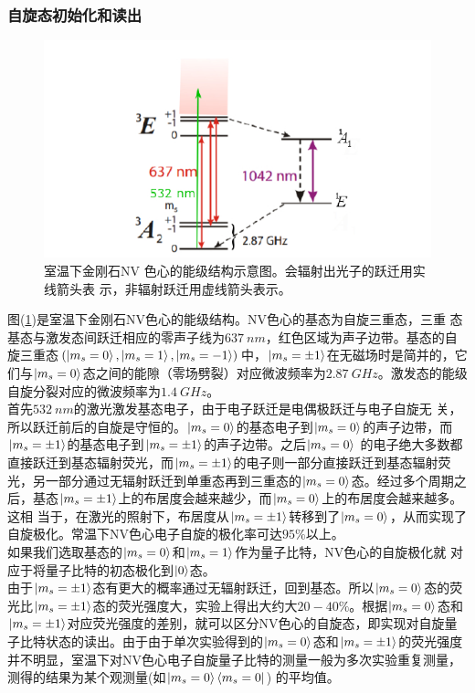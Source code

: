 \documentclass[a4paper]{article}
\begin{document}
\subsubsection{自旋态初始化和读出}
\begin{figure}[H]
	\centering
	\includegraphics[width=0.8\linewidth]{fig/energy.jpg}
	\caption{室温下金刚石NV 色心的能级结构示意图。会辐射出光子的跃迁用实线箭头表
		示，非辐射跃迁用虚线箭头表示。}
	\label{fig:energy}
\end{figure}
图(\ref{fig:energy})是室温下金刚石NV色心的能级结构。NV色心的基态为自旋三重态，三重
态基态与激发态间跃迁相应的零声子线为$ \SI{637}{nm} $，红色区域为声子边带。基态的自旋三重态$ (\ket{m_s=0}, \ket{m_s=1}, \ket{m_s=-1}) $中，$ \ket{m_s=\pm 1} $在无磁场时是简并的，它们与$ \ket{m_s=0} $态之间的能隙（零场劈裂）对应微波频率为$ \SI{2.87}{GHz} $。激发态的能级自旋分裂对应的微波频率为$ \SI{1.4}{GHz} $。\\
首先$ \SI{532}{nm}  $的激光激发基态电子，由于电子跃迁是电偶极跃迁与电子自旋无
关，所以跃迁前后的自旋是守恒的。$ \ket{m_s=0} $的基态电子到$ \ket{m_s=0} $的声子边带，而$ \ket{m_s=\pm 1} $的基态电子到$ \ket{m_s=\pm 1} $的声子边带。之后$ \ket{m_s=0} $ 的电子绝大多数都直接跃迁到基态辐射荧光，而$ \ket{m_s=\pm 1} $的电子则一部分直接跃迁到基态辐射荧光，另一部分通过无辐射跃迁到单重态再到三重态的$ \ket{m_s=0} $态。经过多个周期之后，基态$ \ket{m_s=\pm 1} $上的布居度会越来越少，而$ \ket{m_s=0} $上的布居度会越来越多。这相
当于，在激光的照射下，布居度从$ \ket{m_s=\pm 1} $转移到了$ \ket{m_s=0} $，从而实现了自旋极化。常温下NV色心电子自旋的极化率可达$ 95\% $以上。\\
如果我们选取基态的$ \ket{m_s=0} $和$ \ket{m_s=1} $作为量子比特，NV色心的自旋极化就
对应于将量子比特的初态极化到$ \ket{0} $态。\\
由于$ \ket{m_s=\pm 1} $态有更大的概率通过无辐射跃迁，回到基态。所以$ \ket{m_s=0} $态的荧光比$ \ket{m_s=\pm 1} $态的荧光强度大，实验上得出大约大$ 20-40\% $。根据$ \ket{m_s=0} $态和$ \ket{m_s=\pm 1} $对应荧光强度的差别，就可以区分NV色心的自旋态，即实现对自旋量子比特状态的读出。由于由于单次实验得到的$ \ket{m_s=0} $态和$ \ket{m_s=\pm 1} $的荧光强度并不明显，室温下对NV色心电子自旋量子比特的测量一般为多次实验重复测量，测得的结果为某个观测量(如$ \ket{m_s=0}\bra{m_s=0} $) 的平均值。
\end{document}
